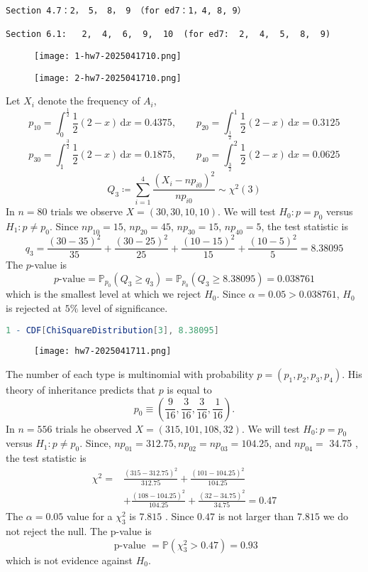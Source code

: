 \begin{lstlisting}
Section 4.7：2， 5， 8， 9 （for ed7：1，4, 8, 9）

Section 6.1:   2,  4,  6,  9,  10  (for ed7:  2,  4,  5,  8,  9)
\end{lstlisting}
\begin{exercise}
\begin{figure}[H]
\centering
\texttt{[image: 1-hw7-2025041710.png]}
\label{}
\end{figure}
\begin{figure}[H]
\centering
\texttt{[image: 2-hw7-2025041710.png]}
\label{}
\end{figure}
\end{exercise}
Let $X_i$ denote the frequency of $A_i$,
\[
p_{10}=\int_{0}^{\frac{1}{2}} \frac{1}{2}(2-x) \, \mathrm{d}x =0.4375,\qquad p_{20}=\int_{\frac{1}{2}}^{1} \frac{1}{2}(2-x) \, \mathrm{d}x =0.3125
\]
\[
p_{30}=\int_{1}^{\frac{3}{2}} \frac{1}{2}(2-x) \, \mathrm{d}x =0.1875,\qquad p_{40}=\int_{\frac{3}{2}}^{2} \frac{1}{2}(2-x) \, \mathrm{d}x =0.0625
\]
\[
Q_3\coloneqq \sum_{i=1}^{4} \frac{(X_i-np_{i0})^2}{np_{i0}}\sim \chi^{2}(3)
\]
In $n=80$ trials we observe $X=(30,30,10,10)$. We will test $H_0:p=p_0$ versus $H_1:p\neq p_0$. Since $np_{10}=15$, $np_{20}=45$, $np_{30}=15$, $np_{40}=5$, the test statistic is
\[
q_3=\frac{(30-35)^2}{35}+\frac{(30-25)^2}{25}+\frac{(10-15)^2}{15}+\frac{(10-5)^2}{5}=8.38095
\]
The $p$-value is
\[
p\text{-value}=\mathbb{P}_{p_0}(Q_3\geq q_3)=\mathbb{P}_{p_0}(Q_3\geq 8.38095)=0.038761
\]
which is the smallest level at which we reject $H_0$. Since $\alpha=0.05>0.038761$, $H_0$ is rejected at $5\%$ level of significance.

\begin{lstlisting}[language=mathematica]
1 - CDF[ChiSquareDistribution[3], 8.38095]
\end{lstlisting}
\begin{exercise}
\begin{figure}[H]
\centering
\texttt{[image: hw7-2025041711.png]}
\label{}
\end{figure}
\end{exercise}
The number of each type is multinomial with probability $p=\left(p_1, p_2, p_3, p_4\right)$. His theory of inheritance predicts that $p$ is equal to
\[
p_0 \equiv\left(\frac{9}{16}, \frac{3}{16}, \frac{3}{16}, \frac{1}{16}\right) .
\]
In $n=556$ trials he observed $X=(315,101,108,32)$. We will test $H_0: p=p_0$ versus $H_1: p \neq p_0$. Since, $n p_{01}=312.75, n p_{02}=n p_{03}=104.25$, and $n p_{04}=$ 34.75 , the test statistic is
\[
\begin{aligned}
\chi^2= & \frac{(315-312.75)^2}{312.75}+\frac{(101-104.25)^2}{104.25} \\
& +\frac{(108-104.25)^2}{104.25}+\frac{(32-34.75)^2}{34.75}=0.47
\end{aligned}
\]
The $\alpha=0.05$ value for a $\chi_3^2$ is $7.815$ . Since $0.47$ is not larger than $7.815$ we do not reject the null. The p-value is
\[
\text { p-value }=\mathbb{P}\left(\chi_3^2>0.47\right)=0.93
\]
which is not evidence against $H_0$.

